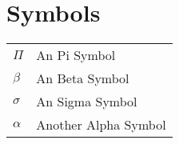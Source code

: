 \chapter*{\centering Symbols}
\begin{spacing}{1.5}
\setlength{\parskip}{0.3in}

\begin{table}[ht]
\centering
\begin{tabular}{ll}
\textbf{$\Pi$} & An Pi Symbol\\
\textbf{$\beta$} & An Beta Symbol\\
\textbf{$\sigma$} & An Sigma Symbol\\
\textbf{$\alpha$} & Another Alpha Symbol\\
\end{tabular}%
\end{table}

\end{spacing}
\newpage
